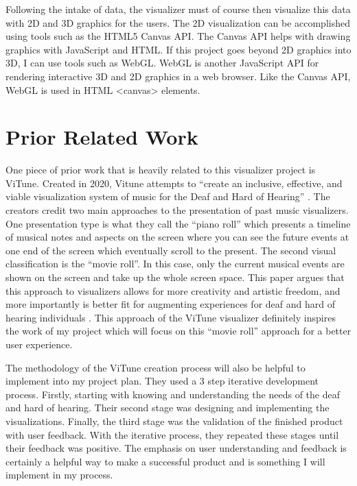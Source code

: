 \documentclass[10pt,twocolumn]{article}
\begin{document}
Following the intake of data, the visualizer must of course then visualize this data with 2D and 3D graphics for the users. The 2D visualization can be accomplished using tools such as the HTML5 Canvas API. The Canvas API helps with drawing graphics with JavaScript and HTML\cite{noauthor_canvas_2024}. If this project goes beyond 2D graphics into 3D, I can use tools such as WebGL. WebGL is another JavaScript API for rendering interactive 3D and 2D graphics in a web browser. Like the Canvas API, WebGL is used in HTML <canvas> elements\cite{noauthor_webgl_nodate}. 


\section{Prior Related Work}
One piece of prior work that is heavily related to this visualizer project is ViTune. Created in 2020, Vitune attempts to “create an inclusive, effective, and viable visualization system of music for the Deaf and Hard of Hearing” \cite{deja_vitune_2020}. The creators credit two main approaches to the presentation of past music visualizers. One presentation type is what they call the “piano roll” which presents a timeline of musical notes and aspects on the screen where you can see the future events at one end of the screen which eventually scroll to the present. The second visual classification is the “movie roll”. In this case, only the current musical events are shown on the screen and take up the whole screen space. This paper argues that this approach to visualizers allows for more creativity and artistic freedom, and more importantly is better fit for augmenting experiences for deaf and hard of hearing individuals \cite{deja_vitune_2020}. This approach of the ViTune visualizer definitely inspires the work of my project which will focus on this “movie roll” approach for a better user experience. 

The methodology of the ViTune creation process will also be helpful to implement into my project plan. They used a 3 step iterative development process. Firstly, starting with knowing and understanding the needs of the deaf and hard of hearing. Their second stage was designing and implementing the visualizations. Finally, the third stage was the validation of the finished product with user feedback. With the iterative process, they repeated these stages until their feedback was positive. The emphasis on user understanding and feedback is certainly a helpful way to make a successful product and is something I will implement in my process. 
\end{document}
